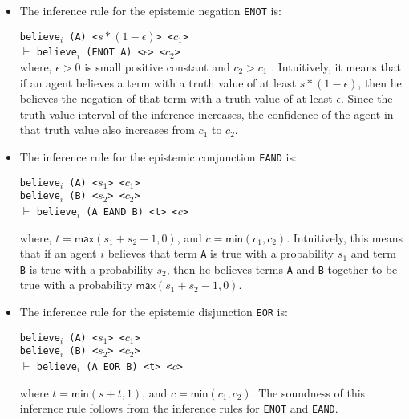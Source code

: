 \documentclass[12pt]{article}
\begin{document}
\begin{itemize}
\item
\noindent The inference rule for the epistemic negation \texttt{ENOT} is:  

\noindent \texttt{believe$_i$ (A) <$s*(1-\epsilon)$> <$c_1$>} \\
 $\vdash$
\texttt{believe$_i$ (ENOT A) <$\epsilon$> <$c_2$>} \\

\noindent where, $\epsilon>0$ is small positive constant and $c_2 >c_1$ . Intuitively, it means that if an agent believes a term with a truth value of at least $s*(1-\epsilon)$, then he believes the negation of that term with a truth value of at least $\epsilon$. Since the truth value interval of the inference increases, the confidence of the agent in that truth value also increases from $c_1$ to $c_2$. 

\item  \noindent The inference rule for the epistemic conjunction \texttt{EAND} is: 

\noindent \texttt{believe$_i$ (A) <$s_1$> <$c_1$>}\\
 \texttt{believe$_i$ (B) <$s_2$> <$c_2$>}\\
 $\vdash$
\texttt{believe$_i$ (A EAND B) <t> <$c$>}  

where, $t = \mathsf{max}(s_1+s_2-1,0)$, and $c=\mathsf{min}(c_1,c_2)$. Intuitively, this means that if an agent $i$ believes that term \texttt{A} is true with a probability $s_1$ and term \texttt{B} is true with a probability $s_2$, then he believes terms \texttt{A} and \texttt{B} together to be true with a probability $\mathsf{max}(s_1+s_2-1,0)$.



 \item \noindent The inference rule for the epistemic disjunction \texttt{EOR} is: 

\noindent \texttt{believe$_i$ (A) <$s_1$> <$c_1$>}\\
 \texttt{believe$_i$ (B) <$s_2$> <$c_2$>}\\
 $\vdash$
\texttt{believe$_i$ (A EOR B) <t> <$c$>}

where $t = \mathsf{min}(s+t,1)$, and $c=\mathsf{min}(c_1,c_2)$. The soundness of this inference rule follows from the inference rules for \texttt{ENOT} and \texttt{EAND}.

 
\end{itemize}
\end{document}
